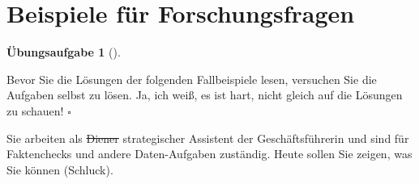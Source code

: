 \documentclass[
  letterpaper,
  twoside,
  open=any]{scrbook}
\theoremstyle{definition}
\newtheorem{exercise}{Übungsaufgabe}[chapter]
\theoremstyle{definition}
\theoremstyle{definition}
\theoremstyle{remark}
\begin{document}
\section{Beispiele für
Forschungsfragen}\label{beispiele-fuxfcr-forschungsfragen}

\begin{exercise}[]\protect\hypertarget{exr-fallbsps}{}\label{exr-fallbsps}

Bevor Sie die Lösungen der folgenden Fallbeispiele lesen, versuchen Sie
die Aufgaben selbst zu lösen. Ja, ich weiß, es ist hart, nicht gleich
auf die Lösungen zu schauen! \(\square\)

\end{exercise}

Sie arbeiten als \st{Diener} strategischer Assistent der
Geschäftsführerin und sind für Faktenchecks und andere Daten-Aufgaben
zuständig. Heute sollen Sie zeigen, was Sie können (Schluck).
\end{document}
